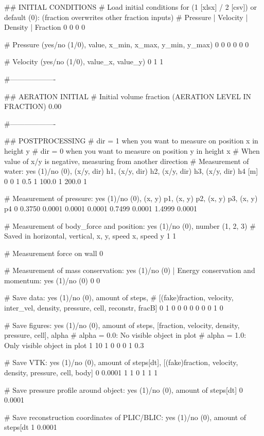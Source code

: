 ## INITIAL CONDITIONS
# Load initial conditions for (1 [xlsx] / 2 [csv]) or default (0): (fraction overwrites other fraction inputs)
# Pressure 		| Velocity		| Density		| Fraction
0   0   0   0

# Pressure (yes/no (1/0), value, x_min, x_max, y_min, y_max)
0 0 0 0 0 0

# Velocity (yes/no (1/0), value_x, value_y)
0 1 1

#-------------------

## AERATION INITIAL
# Initial volume fraction (AERATION LEVEL IN FRACTION)
0.00

#-------------------

## POSTPROCESSING
# dir = 1 when you want to measure on position x in height y
# dir = 0 when you want to measure on position y in height x
# When value of x/y is negative, measuring from another direction
# Measurement of water: yes (1)/no (0), (x/y, dir) h1, (x/y, dir) h2, (x/y, dir) h3, (x/y, dir) h4 [m]
0   0 1  0.5 1  100.0 1  200.0 1

# Measurement of pressure: yes (1)/no (0), (x, y) p1, (x, y) p2, (x, y) p3, (x, y) p4
0	0.3750 0.0001	0.0001 0.0001	0.7499 0.0001     1.4999 0.0001

# Measurement of body_force and position: yes (1)/no (0), number (1, 2, 3)
# Saved in horizontal, vertical, x, y, speed x, speed y
1 1

# Measurement force on wall
0

# Measurement of mass conservation: yes (1)/no (0) | Energy conservation and momentum: yes (1)/no (0)
0 0

# Save data: yes (1)/no (0), amount of steps,
# [(fake)fraction, velocity, inter_vel, density, pressure, cell, reconstr, fracB]
0	1	0 0 0 0 0 0 0 1 0

# Save figures: yes (1)/no (0), amount of steps, [fraction, velocity, density, pressure, cell], alpha
# alpha = 0.0: No visible object in plot
# alpha = 1.0: Only visible object in plot
1 	10	1 0 0 0 1	0.3

# Save VTK: yes (1)/no (0), amount of steps[dt], [(fake)fraction, velocity, density, pressure, cell, body]
0	0.0001	1 1 0 1 1 1

# Save pressure profile around object: yes (1)/no (0), amount of steps[dt]
0  0.0001

# Save reconstruction coordinates of PLIC/BLIC: yes (1)/no (0), amount of steps[dt
1 0.0001
